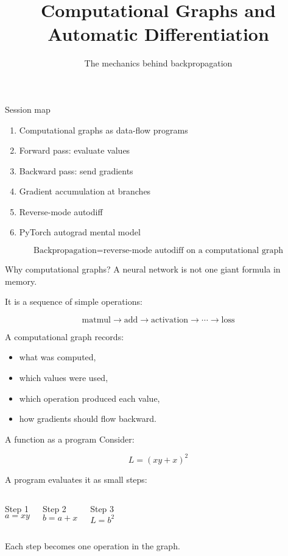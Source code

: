 \documentclass[10pt,aspectratio=169]{beamer}
\title{Computational Graphs and Automatic Differentiation}
\subtitle{The mechanics behind backpropagation}
\author{}
\date{}
\begin{document}
\begin{frame}
\titlepage
\end{frame}
\begin{frame}{Session map}
\begin{enumerate}
    \item Computational graphs as data-flow programs
    \item Forward pass: evaluate values
    \item Backward pass: send gradients
    \item Gradient accumulation at branches
    \item Reverse-mode autodiff
    \item PyTorch autograd mental model
\end{enumerate}

\vspace{0.4cm}

\[
\boxed{
\text{Backpropagation} =
\text{reverse-mode autodiff on a computational graph}
}
\]
\end{frame}

\begin{frame}[t]{Why computational graphs?}
A neural network is not one giant formula in memory.

It is a sequence of simple operations:

\[
\text{matmul}
\rightarrow
\text{add}
\rightarrow
\text{activation}
\rightarrow
\cdots
\rightarrow
\text{loss}
\]

A computational graph records:

\begin{itemize}
    \item what was computed,
    \item which values were used,
    \item which operation produced each value,
    \item how gradients should flow backward.
\end{itemize}
\end{frame}

\begin{frame}[t]{A function as a program}
Consider:

\[
L=(xy+x)^2
\]

A program evaluates it as small steps:

\begin{columns}[T]
\begin{block}{Step 1}
\[
a=xy
\]
\end{block}

\begin{block}{Step 2}
\[
b=a+x
\]
\end{block}

\begin{block}{Step 3}
\[
L=b^2
\]
\end{block}
\end{columns}

\vfill

Each step becomes one operation in the graph.
\end{frame}
\end{document}
